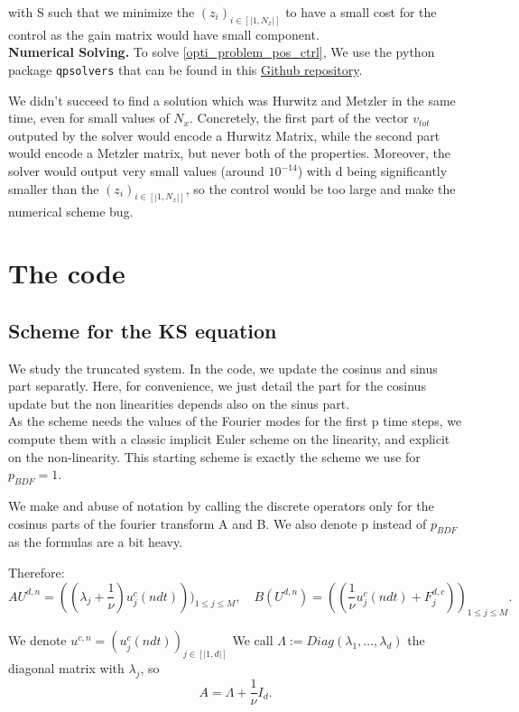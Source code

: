 \documentclass[12pt]{article}
\begin{document}
with S such that we minimize the $(z_i)_{i\in[|1,N_x|]}$ to have a small cost for the control as the gain matrix would have small component.\\


\textbf{Numerical Solving.} To solve \eqref{opti_problem_pos_ctrl}, We use the python package \texttt{qpsolvers} that can be found in this \href{https://github.com/qpsolvers/qpsolvers}{Github repository}. 

We didn't succeed to find a solution which was Hurwitz and Metzler in the same time, even for small values of $N_x$. Concretely, the first part of the vector $v_{tot}$  outputed by the solver would encode a Hurwitz Matrix, while the second part would encode a Metzler matrix, but never both of the properties. Moreover, the solver would output very small values (around $10^{-14}$) with d being significantly smaller than the $(z_i)_{i\in[|1,N_x|]}$, so the control would be too large and make the numerical scheme bug. 




\newpage
\appendix
\section{The code}
\subsection{Scheme for the KS equation}\label{KS_computation_numerics}

We study the truncated system. In the code, we update the cosinus and sinus part separatly. Here, for convenience, we just detail the part for the cosinus update but the non linearities depends also on the sinus part.
\\
As the scheme needs the values of the Fourier modes for the first p time steps, we compute them with a classic implicit Euler scheme on the linearity, and explicit on the non-linearity. This starting scheme is exactly the scheme we use for $p_{BDF}=1.$

We make and abuse of notation by calling the discrete operators only for the cosinus parts of the fourier transform A and B. We also denote p instead of $p_{BDF}$ as the formulas are a bit heavy.

Therefore: 
$$AU^{d,n} = ((\lambda_j + \frac{1}{\nu})u_j^c(ndt)))_{1\leq j \leq M}, \quad B(U^{d,n}) = ((\frac{1}{\nu}u_j^c(ndt) + F_j^{d,c}))_{1\leq j \leq M}.$$


We denote $u^{c,n} =(u_j^c(ndt))_{j\in [|1,d|]}$
We call $\Lambda:= Diag(\lambda_1,\dots,\lambda_d)$ the diagonal matrix with $\lambda_j$,  so $$A = \Lambda + \frac{1}{\nu}I_d.$$
  
\end{document}
